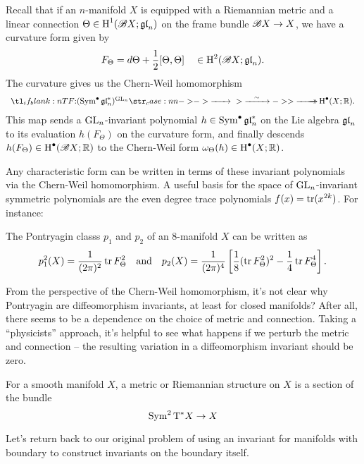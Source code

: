 Recall that if an $n$-manifold $X$ is equipped with a Riemannian metric and a linear connection $\Theta \in \operatorname{H}^1(\mathscr{B} X; \mathfrak{gl}_n)$ on the frame bundle $\mathscr{B} X \to X$, we have a curvature form given by
\[
    F_\Theta = d\Theta + \frac{1}{2}[\Theta, \Theta]\quad\in \operatorname{H}^2(\mathscr{B} X; \mathfrak{gl}_n).
\]
The curvature gives us the Chern-Weil homomorphism
\[
  \lkxfunc{}{(\Sym^\bullet \gl_n^\d)^{\GL_n}}{\H^\bullet(X; \R).}
\]
This map sends a ${\operatorname{GL}}_n$-invariant polynomial $h\in \operatorname{\operatorname{Sym}}^\bullet \mathfrak{gl}^*_n$ on the Lie algebra $\mathfrak{gl}_n$ to its evaluation $h(F_\Theta)$ on the curvature form, and finally descends $h(F_\Theta)\in \operatorname{H}^\bullet(\mathscr{B} X; \mathbb{R})$ to the Chern-Weil form $\omega_\Theta(h) \in \operatorname{H}^\bullet(X; \mathbb{R})$.

Any characteristic form can be written in terms of these invariant polynomials via the Chern-Weil homomorphism. A useful basis for the space of ${\operatorname{GL}}_n$-invariant symmetric polynomials are the even degree trace polynomials $f(x)=\operatorname{\operatorname{tr}}(x^{2k})$. For instance:
\begin{example}
  The Pontryagin classs $p_1$ and $p_2$ of an $8$-manifold $X$ can be written as
\[
  p_1^2(X) = \frac{1}{(2\pi)^2}\operatorname{\operatorname{tr}} F_\Theta^2
  \quad\textrm{and}\quad
  p_2(X) = \frac{1}{(2\pi)^4}\left[ \frac{1}{8}(\operatorname{\operatorname{tr}} F_\Theta^2)^2 - \frac{1}{4}\operatorname{\operatorname{tr}} F_\Theta^4\right].
\]
\end{example}

From the perspective of the Chern-Weil homomorphism, it's not clear why
Pontryagin are diffeomorphism invariants, at least for closed manifolds? After all, there seems to be a dependence on the choice of metric and connection.
Taking a ``physicists'' approach, it's helpful to see what happens if we perturb the metric and connection -- the resulting variation in a diffeomorphism invariant should be zero.

\begin{remark}
  For a smooth manifold $X$, a metric or Riemannian structure on $X$ is a section of the bundle
  \[
    \operatorname{\operatorname{Sym}}^2 \mathrm{T}^* X \to X
  \]
\end{remark}



Let's return back to our original problem of using an invariant for manifolds with boundary to construct invariants on the boundary itself.


\bigskip


